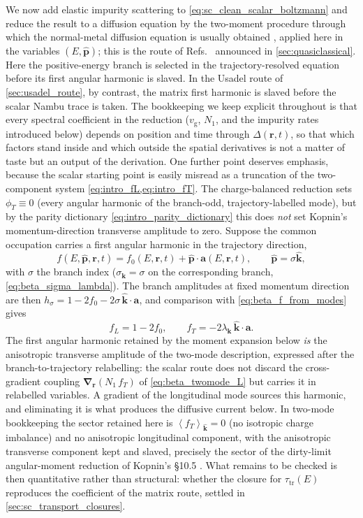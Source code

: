 \documentclass[
  aps,
  prb,
  preprint,
  superscriptaddress,
  longbibliography,
  nofootinbib
]{revtex4-2}
\newcommand{\avg}[1]{\left\langle #1 \right\rangle}
\newcommand{\br}{\mathbf{r}}
\newcommand{\bk}{\mathbf{k}}
\newcommand{\bp}{\mathbf{p}}
\newcommand{\bnabla}{\boldsymbol{\nabla}}
\newcommand{\vg}{v_{\mathrm{g}}}
\newcommand{\tautr}{\tau_{\mathrm{tr}}}
\newcommand{\DOS}{N_1}
\newcommand{\fL}{f_L}
\newcommand{\fT}{f_T}
\begin{document}
We now add elastic impurity scattering to \cref{eq:sc_clean_scalar_boltzmann}
and reduce the result to a diffusion equation by the two-moment procedure
through which the normal-metal diffusion equation is usually obtained
\cite{ziman1960,ashcroft1976}, applied here in the variables \((E,\hat{\bp})\);
this is the route of Refs.~ announced in
\cref{sec:quasiclassical}. Here the positive-energy branch is selected in the
trajectory-resolved equation before its first angular harmonic is slaved.
In the Usadel route of \cref{sec:usadel_route}, by contrast, the matrix first
harmonic is slaved before the scalar Nambu trace is taken. The bookkeeping we
keep explicit throughout is that
every spectral coefficient in the reduction (\(\vg\), \(\DOS\), and the
impurity rates introduced below) depends on position and time through
\(\Delta(\br,t)\), so that which factors stand inside and which outside the
spatial derivatives is not a matter of taste but an output of the
derivation. One further point deserves emphasis, because the scalar
starting point is easily misread as a truncation of the two-component
system \cref{eq:intro_fL,eq:intro_fT}. The charge-balanced reduction
sets \(\phi_T\equiv0\) (every angular harmonic of the branch-odd,
trajectory-labelled mode), but by the parity dictionary
\cref{eq:intro_parity_dictionary} this does \emph{not} set Kopnin's
momentum-direction transverse amplitude to zero. Suppose the common
occupation carries a first angular harmonic in the trajectory
direction,
\begin{equation}
  f(E,\hat{\bp},\br,t)
  =
  f_{0}(E,\br,t)+\hat{\bp}\cdot\mathbf{a}(E,\br,t),
  \qquad
  \hat{\bp}=\sigma\hat{\bk},
  \label{eq:sc_hidden_harmonic_ansatz}
\end{equation}
with \(\sigma\) the branch index (\(\sigma_{\bk}=\sigma\) on the
corresponding branch, \cref{eq:beta_sigma_lambda}). The branch amplitudes at fixed momentum direction are
then
\(h_{\sigma}=1-2f_{0}-2\sigma\,\hat{\bk}\cdot\mathbf{a}\),
and comparison with \cref{eq:beta_f_from_modes} gives
\begin{equation}
  \fL=1-2f_{0},
  \qquad
  \fT=-2\lambda_{\bk}\,\hat{\bk}\cdot\mathbf{a}.
  \label{eq:sc_hidden_harmonic}
\end{equation}
The first angular harmonic retained by the moment expansion below
\emph{is} the anisotropic transverse amplitude of the two-mode
description, expressed after the branch-to-trajectory relabelling: the
scalar route does not discard the cross-gradient coupling
\(\bnabla_{\br}(\DOS\,\fT)\) of \cref{eq:beta_twomode_L} but carries it
in relabelled variables. A gradient of the longitudinal mode sources
this harmonic, and eliminating it is what produces the diffusive
current below. In two-mode bookkeeping the sector retained here is
\(\avg{\fT}_{\hat{\bk}}=0\) (no isotropic charge imbalance) and no
anisotropic longitudinal component, with the anisotropic transverse
component kept and slaved, precisely the sector of the dirty-limit
angular-moment reduction of Kopnin's \S10.5
\cite{kopnin2001}. What remains to be checked is then quantitative
rather than structural: whether the closure for \(\tautr(E)\)
reproduces the coefficient of the matrix route, settled in
\cref{sec:sc_transport_closures}.
\end{document}

